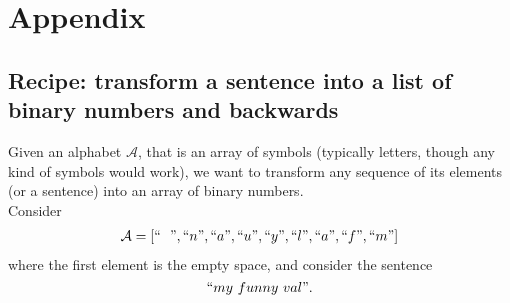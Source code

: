 
\chapter{Appendix}


\section{Recipe: transform a sentence into a list of binary numbers and backwards}

Given an alphabet $\mathcal{A}$, that is an array of symbols (typically letters, though any kind of symbols would work), we want to transform any sequence of its elements (or a sentence) into an array of binary numbers. \\

\noindent
Consider
\begin{align}
   \mathcal{A} = [ ``~~", ``n", ``a", ``u", ``y", ``l", ``a", ``f", ``m" ]
\end{align}
where the first element is the empty space, and consider the sentence
$$
   ``my~funny~val".
$$

